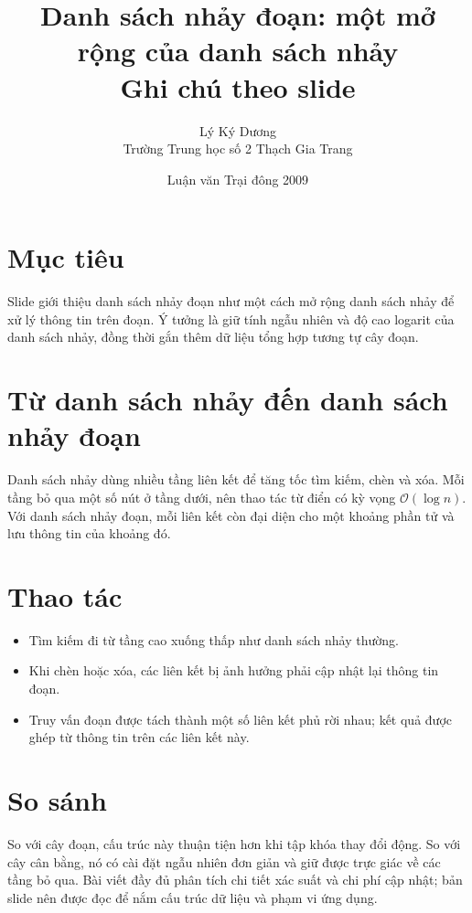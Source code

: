 \documentclass[11pt]{article}
\title{Danh sách nhảy đoạn: một mở rộng của danh sách nhảy\\{\large Ghi chú theo slide}}
\author{Lý Ký Dương\\Trường Trung học số 2 Thạch Gia Trang}
\date{Luận văn Trại đông 2009}
\newcommand{\Oh}{\mathcal{O}}
\begin{document}
\maketitle


\section{Mục tiêu}

Slide giới thiệu danh sách nhảy đoạn như một cách mở rộng danh sách nhảy để
xử lý thông tin trên đoạn. Ý tưởng là giữ tính ngẫu nhiên và độ cao logarit
của danh sách nhảy, đồng thời gắn thêm dữ liệu tổng hợp tương tự cây đoạn.

\section{Từ danh sách nhảy đến danh sách nhảy đoạn}

Danh sách nhảy dùng nhiều tầng liên kết để tăng tốc tìm kiếm, chèn và xóa.
Mỗi tầng bỏ qua một số nút ở tầng dưới, nên thao tác từ điển có kỳ vọng
\(\Oh(\log n)\). Với danh sách nhảy đoạn, mỗi liên kết còn đại diện cho một
khoảng phần tử và lưu thông tin của khoảng đó.

\section{Thao tác}

\begin{itemize}
  \item Tìm kiếm đi từ tầng cao xuống thấp như danh sách nhảy thường.
  \item Khi chèn hoặc xóa, các liên kết bị ảnh hưởng phải cập nhật lại thông
  tin đoạn.
  \item Truy vấn đoạn được tách thành một số liên kết phủ rời nhau; kết quả
  được ghép từ thông tin trên các liên kết này.
\end{itemize}

\section{So sánh}

So với cây đoạn, cấu trúc này thuận tiện hơn khi tập khóa thay đổi động. So
với cây cân bằng, nó có cài đặt ngẫu nhiên đơn giản và giữ được trực giác về
các tầng bỏ qua. Bài viết đầy đủ phân tích chi tiết xác suất và chi phí cập
nhật; bản slide nên được đọc để nắm cấu trúc dữ liệu và phạm vi ứng dụng.
\end{document}
